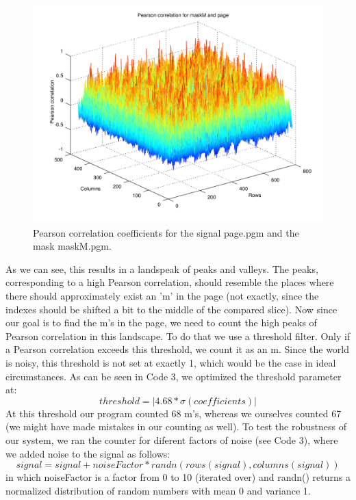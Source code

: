 \documentclass{article}
\begin{document}
\begin{figure}[H]
 \centering
 \includegraphics[width=.7\textwidth]{mesh3.png}
 \caption{Pearson correlation coefficients for the signal page.pgm and the mask maskM.pgm.}
 \label{fig3}
\end{figure}

As we can see, this results in a landspeak of peaks and valleys. The peaks, corresponding to a high Pearson correlation, should resemble
the places where there should approximately exist an 'm' in the page (not exactly, since the indexes should be shifted a bit to the middle of the 
compared slice). Now since our goal is to find the m's in the page, we need to count the high peaks of Pearson correlation in this landscape.
To do that we use a threshold filter. Only if a Pearson correlation exceeds this threshold, we count it as an m. Since the world is noisy, 
this threshold is not set at exactly 1, which would be the case in ideal circumstances. As can be seen in Code 3, we optimized the threshold
parameter at:
\begin{equation}
threshold = |4.68 * \sigma(coefficients)| 
\end{equation}
At this threshold our program counted 68 m's, whereas we ourselves counted 67 (we might have
made mistakes in our counting as well). To test the robustness of our system, we ran the counter for diferent factors of noise (see Code 3), where we added noise to the signal as follows:
\begin{equation}
 signal = signal + noiseFactor * randn(rows(signal),columns(signal))
\end{equation}
in which noiseFactor is a factor from 0 to 10 (iterated over) and randn() returns a normalized distribution of random numbers with mean 0 and variance 1.
\end{document}

